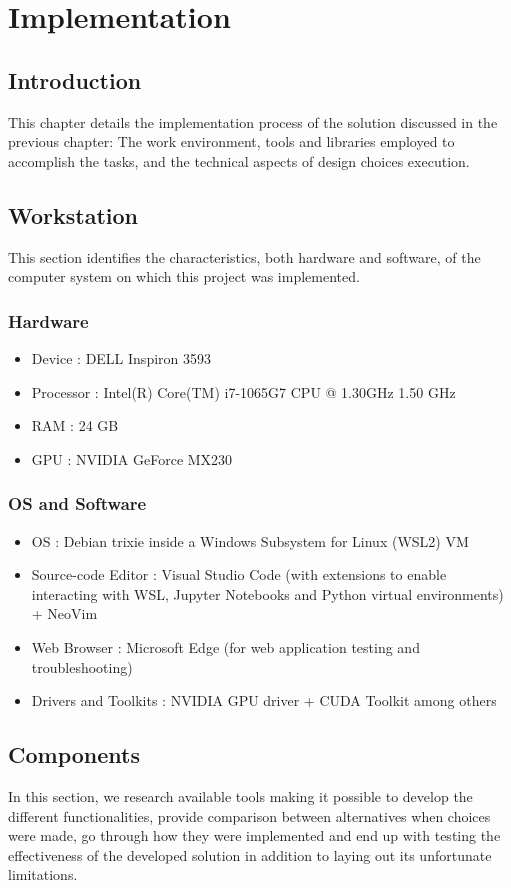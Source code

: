 \chapter{Implementation}

\section{Introduction}
This chapter details the implementation process of the solution discussed in the previous chapter: The work environment, tools and libraries employed to accomplish the tasks, and the technical aspects of design choices execution.

\section{Workstation}
This section identifies the characteristics, both hardware and software, of the computer system on which this project was implemented.
\bigskip
\subsection{Hardware}
\smallskip
\begin{itemize}
    \item Device : DELL Inspiron 3593
    \item Processor : Intel(R) Core(TM) i7-1065G7 CPU @ 1.30GHz   1.50 GHz
    \item RAM : 24 GB
    \item GPU : NVIDIA GeForce MX230
\end{itemize}
\medskip
\subsection{OS and Software}
\smallskip
\begin{itemize}
    \item OS : Debian trixie inside a Windows Subsystem for Linux (WSL2) VM
    \item Source-code Editor : Visual Studio Code (with extensions to enable interacting with WSL, Jupyter Notebooks and Python virtual environments) + NeoVim
    \item Web Browser : Microsoft Edge (for web application testing and troubleshooting)
    \item Drivers and Toolkits : NVIDIA GPU driver + CUDA Toolkit among others
\end{itemize}

\section{Components}
In this section, we research available tools making it possible to develop the different functionalities, provide comparison between alternatives when choices were made, go through how they were implemented and end up with testing the effectiveness of the developed solution in addition to laying out its unfortunate limitations.
